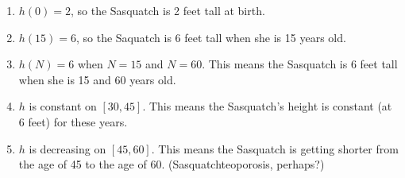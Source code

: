 \begin{enumerate}
\setcounter{enumi}{\value{HW}}

\item  $h(0) = 2$, so the Sasquatch is 2 feet tall at birth.

\item  $h(15) = 6$, so the Saquatch is 6 feet tall when she is 15 years old.

\item  $h(N) = 6$ when $N = 15$ and $N=60$.  This means the Sasquatch is 6 feet tall when she is 15 and 60 years old.

\item  $h$ is constant on $[30,45]$.  This means the Sasquatch's height is constant (at 6 feet) for these years.

\item  $h$ is decreasing on $[45,60]$.  This means the Sasquatch is getting shorter from the age of 45 to the age of 60. (Sasquatchteoporosis, perhaps?)

\setcounter{HW}{\value{enumi}}
\end{enumerate}


